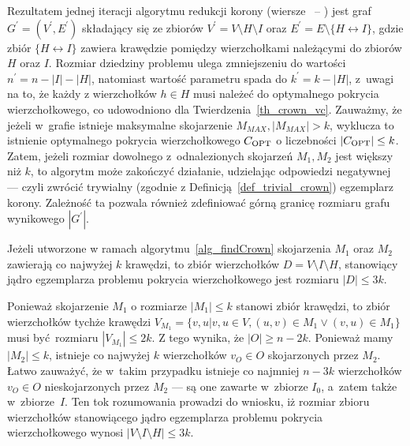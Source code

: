 \par{
  Rezultatem jednej iteracji algorytmu redukcji korony (wiersze~ -- ) jest graf
  $G^\prime=(V^\prime, E^\prime)$ składający się ze zbiorów $V^\prime=V\setminus H \setminus I$ oraz $E^\prime = E \setminus \{H\leftrightarrow I\}$, gdzie zbiór $\{H\leftrightarrow I\}$ zawiera krawędzie pomiędzy wierzchołkami należącymi do zbiorów $H$ oraz $I$.
  Rozmiar dziedziny problemu ulega zmniejszeniu do wartości $n^\prime=n-|I|-|H|$, natomiast wartość parametru spada do $k^\prime=k-|H|$,
  z~uwagi na to, że każdy z wierzchołków $h \in H$ musi należeć do optymalnego pokrycia wierzchołkowego, co udowodniono dla Twierdzenia~\ref{th_crown_vc}.
  Zauważmy, że jeżeli w~grafie istnieje maksymalne skojarzenie $M_{MAX}, |M_{MAX}| > k$, wyklucza to istnienie optymalnego pokrycia wierzchołkowego $C_{\textnormal{OPT}}$ o liczebności $|C_{\textnormal{OPT}}|\leq k$.
  Zatem, jeżeli rozmiar dowolnego z~odnalezionych skojarzeń $M_1, M_2$ jest większy niż $k$, to algorytm może zakończyć działanie, udzielając odpowiedzi negatywnej --- czyli zwrócić trywialny (zgodnie z Definicją~\ref{def_trivial_crown}) egzemplarz korony.
  Zależność ta pozwala również zdefiniować górną granicę rozmiaru grafu wynikowego $|G^\prime|$.
}
\begin{theorem}
  Jeżeli utworzone w ramach algorytmu~\ref{alg_findCrown} skojarzenia $M_1$ oraz $M_2$ zawierają co najwyżej $k$ krawędzi, to zbiór wierzchołków $D=V \setminus I \setminus H$, stanowiący jądro egzemplarza problemu pokrycia wierzchołkowego jest rozmiaru $|D| \leq 3k$.
\end{theorem}
\begin{bproof}
  Ponieważ skojarzenie $M_1$ o rozmiarze $|M_1| \leq k$ stanowi zbiór krawędzi, to zbiór wierzchołków tychże krawędzi $V_{M_1}=\{v, u|v, u \in V, (u,v)\in M_1 \lor (v,u) \in M_1\}$ musi być rozmiaru $ |V_{M_1}| \leq 2k$.
  Z tego wynika, że $|O| \geq n-2k$.
  Ponieważ mamy $|M_2| \leq k$, istnieje co najwyżej $k$ wierzchołków $v_O \in O$ skojarzonych przez $M_2$.
  Łatwo zauważyć, że w~takim przypadku istnieje co najmniej $n-3k$ wierzchołków $v_O \in O$ nieskojarzonych przez $M_2$ --- są one zawarte w~zbiorze $I_0$, a~zatem także w~zbiorze~$I$.
  Ten tok rozumowania prowadzi do wniosku, iż rozmiar zbioru wierzchołków stanowiącego jądro egzemplarza problemu pokrycia wierzchołkowego wynosi $|V \setminus I \setminus H| \leq 3k$.
\end{bproof}
